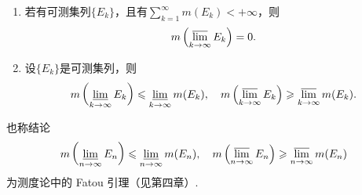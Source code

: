 \documentclass[../../main.tex]{subfiles}
\begin{document}
\begin{theorem}\label{theorem:可测集的Fatou引理}
\begin{enumerate}[(1)]
\item 若有可测集列$\{E_k\}$，且有$\sum_{k = 1}^{\infty}m(E_k)<+\infty$，则
\begin{align*}
m\left(\varlimsup_{k\to\infty}E_k\right)= 0.
\end{align*}

\item 设$\{E_k\}$是可测集列，则
\begin{align*}
m\left(\varliminf_{k\to\infty}E_k\right)\leqslant\varliminf_{k\to\infty}m(E_k),\quad m\left(\varlimsup_{k\to\infty}E_k\right)\geqslant\varlimsup_{k\to\infty}m(E_k).
\end{align*}
\end{enumerate}
\end{theorem}
\begin{remark}
也称结论
\begin{align*}
m\left(\varliminf_{n\to\infty}E_n\right)\leqslant\varliminf_{n\to\infty}m(E_n),\quad m\left(\varlimsup_{n\to\infty}E_n\right)\geqslant\varlimsup_{n\to\infty}m(E_n)
\end{align*}
为测度论中的 Fatou 引理（见第四章）.
\end{remark}
\end{document}
